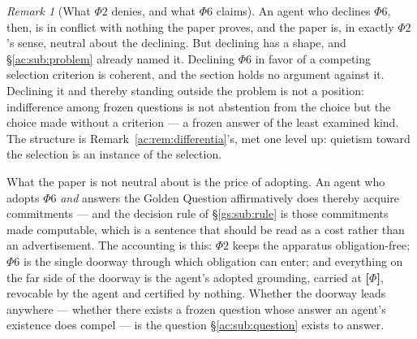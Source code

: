 \documentclass[11pt]{article}
\numberwithin{equation}{section}
\theoremstyle{plain}
\theoremstyle{definition}
\theoremstyle{remark}
\newtheorem{remark}[theorem]{Remark}
\begin{document}
\begin{remark}[What $\Phi2$ denies, and what $\Phi6$ claims]
An agent who declines $\Phi6$, then, is in conflict with nothing the paper proves, and the paper is, in exactly $\Phi2$'s sense, neutral about the declining. But declining has a shape, and \S\ref{ac:sub:problem} already named it. Declining $\Phi6$ in favor of a competing selection criterion is coherent, and the section holds no argument against it. Declining it and thereby standing outside the problem is not a position: indifference among frozen questions is not abstention from the choice but the choice made without a criterion --- a frozen answer of the least examined kind. The structure is Remark~\ref{ac:rem:differentia}'s, met one level up: quietism toward the selection is an instance of the selection.
\end{remark}

What the paper is not neutral about is the price of adopting. An agent who adopts $\Phi6$ \emph{and} answers the Golden Question affirmatively does thereby acquire commitments --- and the decision rule of \S\ref{gs:sub:rule} is those commitments made computable, which is a sentence that should be read as a cost rather than an advertisement. The accounting is this: $\Phi2$ keeps the apparatus obligation-free; $\Phi6$ is the single doorway through which obligation can enter; and everything on the far side of the doorway is the agent's adopted grounding, carried at \textbf{[$\Phi$]}, revocable by the agent and certified by nothing. Whether the doorway leads anywhere --- whether there exists a frozen question whose answer an agent's existence does compel --- is the question \S\ref{ac:sub:question} exists to answer.

%
%
\end{document}
